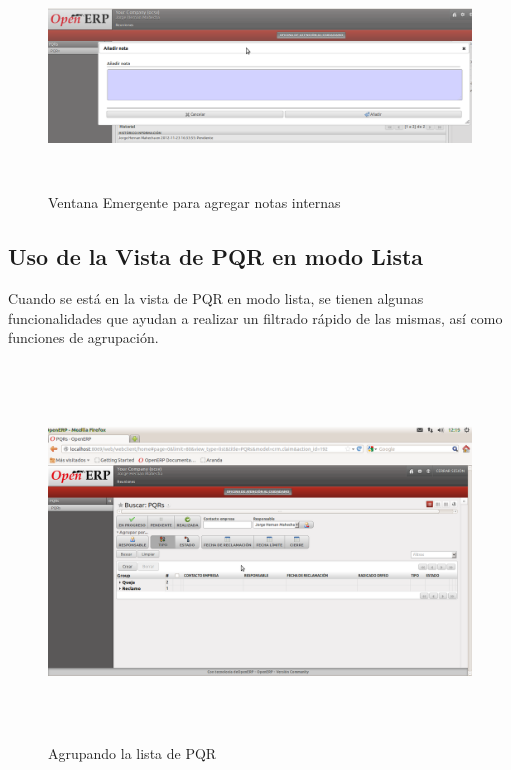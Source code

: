 \begin{figure}
 \centering
 \includegraphics[width=17cm,height=6cm]{./Imagenes/addnote.png}
 \caption{Ventana Emergente para agregar notas internas}
 \label{fig:addnote}
\end{figure}


\subsection{Uso de la Vista de PQR en modo Lista}

Cuando se está en la vista de PQR en modo lista, se tienen algunas funcionalidades que ayudan a realizar un filtrado rápido de las mismas,
así como funciones de agrupación. 

\begin{figure}
 \centering
 \includegraphics[width=17cm,height=10cm]{./Imagenes/menulistagroup.png}
 \caption{Agrupando la lista de PQR}
 \label{fig:menulistagroup}
\end{figure}

